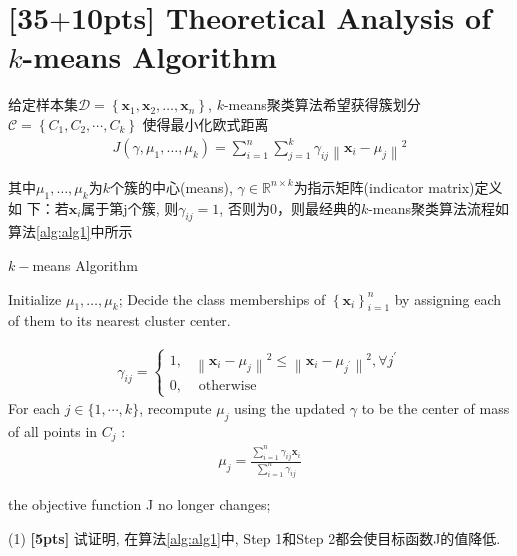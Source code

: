 \documentclass[a4paper,UTF8]{article}
\theoremstyle{definition}
\begin{document}
\section{\textbf{[35$+$10pts]} Theoretical Analysis of $k$-means Algorithm}
给定样本集$\mathcal{D}=\left\{\mathbf{x}_{1}, \mathbf{x}_{2}, \ldots, \mathbf{x}_{n}\right\}$, $k$-means聚类算法希望获得簇划分$\mathcal{C}=\left\{C_{1}, C_{2}, \cdots, C_{k}\right\}$
使得最小化欧式距离
\begin{align} \label{eq1}
J\left(\gamma, \mu_{1}, \ldots, \mu_{k}\right)=\sum_{i=1}^{n} \sum_{j=1}^{k} \gamma_{i j}\left\|\mathbf{x}_{i}-\mu_{j}\right\|^{2}
\end{align}

其中$\mu_{1}, \ldots, \mu_{k}$为$k$个簇的中心(means), 
 $\gamma \in \mathbb{R}^{n \times k}$为指示矩阵(indicator matrix)定义如
下：若$\mathbf{x}_{i}$属于第j个簇, 则$\gamma_{i j}=1$, 否则为0，则最经典的$k$-means聚类算法流程如算法\ref{alg:alg1}中所示

{\begin{algorithm}[h]
		\caption{ $k-$means Algorithm }
		\label{alg:alg1}
		\begin{algorithmic}[1]{
				\STATE Initialize $\mu_{1}, \ldots, \mu_{k}$;
				\REPEAT
				 Decide the class memberships of $\left\{\mathbf{x}_{i}\right\}_{i=1}^{n}$ by assigning each of them
				to its nearest cluster center.
				
				\begin{align}\gamma_{i j}=\left\{\begin{array}{ll}
				1, & \left\|\mathbf{x}_{i}-\mu_{j}\right\|^{2} \leq\left\|\mathbf{x}_{i}-\mu_{j^{\prime}}\right\|^{2}, \forall j^{\prime} \\
				0, & \text { otherwise }
				\end{array}\right.\end{align}
				 For each $j \in\{1, \cdots, k\}$, recompute $\mu_j$ using the updated 
$\gamma$ to be	the center of mass of all points in $C_j$ :
			\begin{align}\mu_{j}=\frac{\sum_{i=1}^{n} \gamma_{i j} \mathbf{x}_{i}}{\sum_{i=1}^{n} \gamma_{i j}}
			\end{align}	
		
				\UNTIL the objective function J no longer changes;}
		\end{algorithmic}
		
\end{algorithm}}


(1) \textbf{[5pts]} 试证明, 在算法\ref{alg:alg1}中, Step 1和Step 2都会使目标函数J的值降低.
\end{document}
